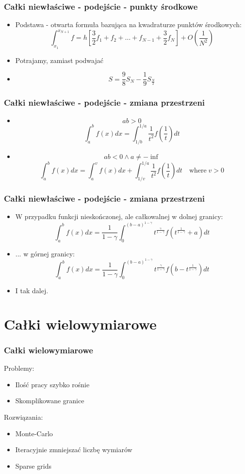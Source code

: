\documentclass[compress,red]{beamer}
\begin{document}
\begin{frame}
  \frametitle{Całki niewłaściwe - podejście - punkty środkowe}
  \begin{itemize}
  \item Podstawa - otwarta formuła bazująca na kwadraturze punktów środkowych:
    \[
    \int_{x_1}^{x_{N+1}} f = h \left[ \frac{3}{2}f_1 + f_2 +  \ldots + f_{N-1} + \frac{3}{2}f_{N} \right]
    + O(\frac{1}{N^2})\]
  \item Potrajamy, zamiast podwajać
  \item \[ S = \frac{9}{8}S_{N} - \frac{1}{9}S_{\frac{N}{2}} \]
  \end{itemize}
\end{frame}

\begin{frame}
  \frametitle{Całki niewłaściwe - podejście - zmiana przestrzeni}
  \begin{itemize}
  \item
    \[ ab > 0 \]
    \[ \int_{a}^{b} f(x)dx =
    \int_{1/b}^{1/a}\frac{1}{t^2}f(\frac{1}{t})dt \]
    \pause
  \item
    \[ ab < 0 \wedge a \not= -\inf \]
    \[ \int_{a}^{b} f(x)dx = \int_{a}^{v} f(x)dx + \int_{1/v}^{1/a}
    \frac{1}{t^2}f(\frac{1}{t})dt \quad \text{where}\; v > 0 \]
  \end{itemize}
\end{frame}

\begin{frame}
  \frametitle{Całki niewłaściwe - podejście - zmiana przestrzeni}
  \begin{itemize}
  \item W przypadku funkcji nieskończonej, ale całkowalnej w dolnej granicy:
    \[ \int_{a}^{b} f(x)dx =
    \frac{1}{1-\gamma} \int_0^{(b-a)^{1-\gamma}}
    t^{\frac{\gamma}{1-\gamma}} f(t^{\frac{1}{1-\gamma}} + a)dt \]
    \pause
  \item ... w górnej granicy:
    \[ \int_{a}^{b} f(x)dx =
    \frac{1}{1-\gamma} \int_0^{(b-a)^{1-\gamma}}
    t^{\frac{\gamma}{1-\gamma}} f(b - t^{\frac{1}{1-\gamma}})dt \]
  \item I tak dalej.
  \end{itemize}
\end{frame}


\section{Całki wielowymiarowe}
\begin{frame}
  \frametitle{Całki wielowymiarowe}
  Problemy:
  \begin{itemize}
  \item Ilość pracy szybko rośnie
  \item Skomplikowane granice
  \end{itemize}
  Rozwiązania:
  \begin{itemize}
  \item Monte-Carlo
  \item Iteracyjnie zmniejszać liczbę wymiarów
  \item Sparse grids
  \end{itemize}
\end{frame}
\end{document}
